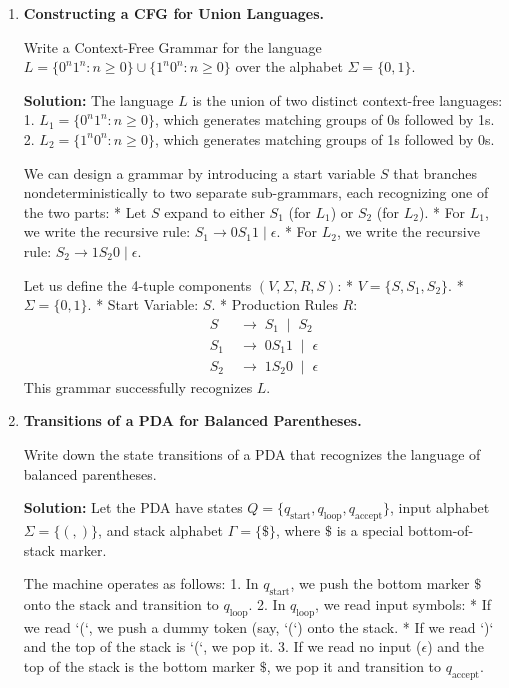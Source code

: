 \documentclass[12pt, a4paper]{book}
\begin{document}
\begin{problembox}
\begin{enumerate}[label=\textbf{E\arabic*.}]
  \item \textbf{Constructing a CFG for Union Languages.}
  
        Write a Context-Free Grammar for the language $L = \{0^n 1^n : n \ge 0\} \cup \{1^n 0^n : n \ge 0\}$ over the alphabet $\Sigma = \{0, 1\}$.
        
        \textbf{Solution:}
        The language $L$ is the union of two distinct context-free languages:
        1. $L_1 = \{0^n 1^n : n \ge 0\}$, which generates matching groups of 0s followed by 1s.
        2. $L_2 = \{1^n 0^n : n \ge 0\}$, which generates matching groups of 1s followed by 0s.
        
        We can design a grammar by introducing a start variable $S$ that branches nondeterministically to two separate sub-grammars, each recognizing one of the two parts:
        * Let $S$ expand to either $S_1$ (for $L_1$) or $S_2$ (for $L_2$).
        * For $L_1$, we write the recursive rule: $S_1 \to 0 S_1 1 \mid \epsilon$.
        * For $L_2$, we write the recursive rule: $S_2 \to 1 S_2 0 \mid \epsilon$.
        
        Let us define the 4-tuple components $(V, \Sigma, R, S)$:
        * $V = \{S, S_1, S_2\}$.
        * $\Sigma = \{0, 1\}$.
        * Start Variable: $S$.
        * Production Rules $R$:
          \[
            \begin{aligned}
              S   &\;\to\; S_1 \;\mid\; S_2 \\
              S_1 &\;\to\; 0 S_1 1 \;\mid\; \epsilon \\
              S_2 &\;\to\; 1 S_2 0 \;\mid\; \epsilon
            \end{aligned}
          \]
        This grammar successfully recognizes $L$.
        
  \item \textbf{Transitions of a PDA for Balanced Parentheses.}
  
        Write down the state transitions of a PDA that recognizes the language of balanced parentheses.
        
        \textbf{Solution:}
        Let the PDA have states $Q = \{q_{\text{start}}, q_{\text{loop}}, q_{\text{accept}}\}$, input alphabet $\Sigma = \{(, )\}$, and stack alphabet $\Gamma = \{\$\}$, where $\$$ is a special bottom-of-stack marker.
        
        The machine operates as follows:
        1. In $q_{\text{start}}$, we push the bottom marker $\$$ onto the stack and transition to $q_{\text{loop}}$.
        2. In $q_{\text{loop}}$, we read input symbols:
           * If we read `(`, we push a dummy token (say, `(`) onto the stack.
           * If we read `)` and the top of the stack is `(`, we pop it.
        3. If we read no input ($\epsilon$) and the top of the stack is the bottom marker $\$$, we pop it and transition to $q_{\text{accept}}$.
        

\end{enumerate}
\end{problembox}
\end{document}
